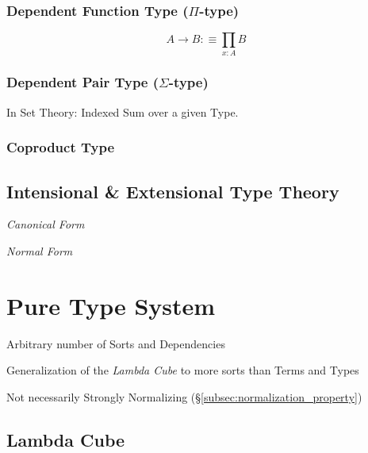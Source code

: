 \subsubsection{Dependent Function Type ($\Pi$-type)}

\[
    A \rightarrow B :\equiv \prod_{x:A} B
\]

\subsubsection{Dependent Pair Type ($\Sigma$-type)}

In Set Theory: Indexed Sum over a given Type.

\subsubsection{Coproduct Type}



\subsection{Intensional \& Extensional Type Theory}
\label{subsec:intension_extension}

\emph{Canonical Form}

\emph{Normal Form}



\section{Pure Type System}\label{sec:pure_type_sytem}

Arbitrary number of Sorts and Dependencies

Generalization of the \emph{Lambda Cube} to more sorts than Terms and
Types

Not necessarily Strongly Normalizing (\S\ref{subsec:normalization_property})



\subsection{Lambda Cube}\label{subsec:lambda_cube}

